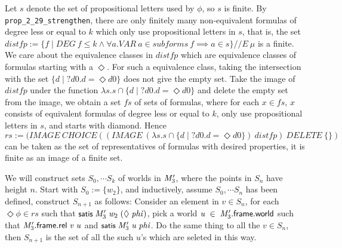 \documentclass[letterpaper]{article}
\renewcommand{\HOLConst}[1]{{\textsf{\upshape\small #1}}}
\renewcommand{\HOLinline}[1]{\ensuremath{#1}}
\begin{document}
Let $s$ denote the set of propositional letters used by $\phi$, so $s$ is finite. By \texttt{prop_2_29_strengthen}, there are only finitely many non-equivalent formulas of degree less or equal to $k$ which only use propositional letters in $s$, that is, the set $distfp:=\{f \mid DEG\ f \le k \land \forall a. VAR\ a \in subforms\ f \implies a \in s\}//E\ \mu$ is a finite. We care about the equivalence classes in $distfp$ which are equivalence classes of formulas starting with a $\Diamond$. For such a equivalence class, taking the intersection with the set $\{d \mid ?d0. d = \Diamond d0\}$ does not give the empty set. Take the image of $distfp$ under the function $\lambda s. s\cap \{d \mid ?d0. d = \Diamond d0\}$ and delete the empty set from the image, we obtain a set $fs$ of sets of formulas, where for each $x\in fs$, $x$ consists of equivalent formulas of degree less or equal to $k$, only use propositional letters in $s$, and starts with diamond. Hence 
$rs:=(IMAGE\ CHOICE ((IMAGE \ (\lambda s. s \cap \{d \mid ?d0. d = \Diamond d0\}) \ distfp) \ DELETE \ \{\})$ can be taken as the set of representatives of formulas with desired properties, it is finite as an image of a finite set. 

We will construct sets $S_0,\cdots S_k$ of worlds in \HOLinline{\HOLFreeVar{M\sb{\mathrm{3}}\sp{\prime}}}, where the points in $S_n$ have height $n$. Start with $S_0:=\{w_2\}$, and inductively, assume $S_0,\cdots S_n$ has been defined, construct $S_{n+1}$ as follows: Consider an element in $v\in S_n$, for each $\Diamond \phi\in rs$ such that \HOLinline{\HOLConst{satis}\;\HOLFreeVar{M\sb{\mathrm{3}}\sp{\prime}}\;\HOLFreeVar{w\sb{\mathrm{2}}}\;(\HOLSymConst{\ensuremath{\Diamond}}\;\HOLFreeVar{phi})}, pick a world \HOLinline{\HOLFreeVar{u}\;\HOLSymConst{\HOLTokenIn{}}\;\HOLFreeVar{M\sb{\mathrm{3}}\sp{\prime}}.\HOLFieldName{frame}.\HOLFieldName{world}} such that \HOLinline{\HOLFreeVar{M\sb{\mathrm{3}}\sp{\prime}}.\HOLFieldName{frame}.\HOLFieldName{rel}\;\HOLFreeVar{v}\;\HOLFreeVar{u}} and \HOLinline{\HOLConst{satis}\;\HOLFreeVar{M\sb{\mathrm{3}}\sp{\prime}}\;\HOLFreeVar{u}\;\HOLFreeVar{phi}}. Do the same thing to all the $v\in S_n$, then $S_{n+1}$ is the set of all the such $u$'s which are seleted in this way. 
\end{document}
